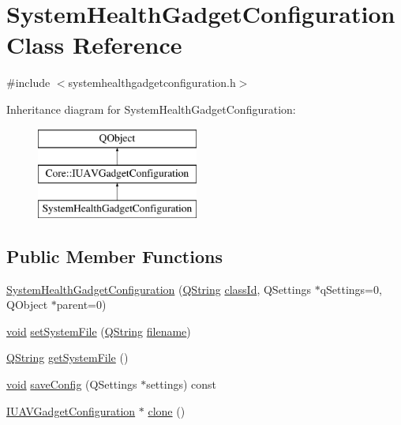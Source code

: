 \hypertarget{class_system_health_gadget_configuration}{\section{System\-Health\-Gadget\-Configuration Class Reference}
\label{class_system_health_gadget_configuration}
}


{\ttfamily \#include $<$systemhealthgadgetconfiguration.\-h$>$}

Inheritance diagram for System\-Health\-Gadget\-Configuration\-:\begin{figure}[H]
\begin{center}
\leavevmode
\includegraphics[height=3.000000cm]{class_system_health_gadget_configuration}
\end{center}
\end{figure}
\subsection*{Public Member Functions}
\begin{DoxyCompactItemize}
\item 
\hyperlink{group___system_health_plugin_gae6898d57714b4d34fc5ddc5e47e3af2e}{System\-Health\-Gadget\-Configuration} (\hyperlink{group___u_a_v_objects_plugin_gab9d252f49c333c94a72f97ce3105a32d}{Q\-String} \hyperlink{group___core_plugin_gac953657221ba7fda967ada0408332641}{class\-Id}, Q\-Settings $\ast$q\-Settings=0, Q\-Object $\ast$parent=0)
\item 
\hyperlink{group___u_a_v_objects_plugin_ga444cf2ff3f0ecbe028adce838d373f5c}{void} \hyperlink{group___system_health_plugin_gae877ad975152eb4b4df1076138610d0e}{set\-System\-File} (\hyperlink{group___u_a_v_objects_plugin_gab9d252f49c333c94a72f97ce3105a32d}{Q\-String} \hyperlink{ioapi_8h_a7a03a664b090ce5c848ecb31cb4a2fa8}{filename})
\item 
\hyperlink{group___u_a_v_objects_plugin_gab9d252f49c333c94a72f97ce3105a32d}{Q\-String} \hyperlink{group___system_health_plugin_ga4807e799ef6d19b807497d0c74295b32}{get\-System\-File} ()
\item 
\hyperlink{group___u_a_v_objects_plugin_ga444cf2ff3f0ecbe028adce838d373f5c}{void} \hyperlink{group___system_health_plugin_gabbb3ed58da74764c327a4933fbc81a53}{save\-Config} (Q\-Settings $\ast$settings) const 
\item 
\hyperlink{group___core_plugin_gacdfdf0b1e39b5002472b76b6564ce51f}{I\-U\-A\-V\-Gadget\-Configuration} $\ast$ \hyperlink{group___system_health_plugin_gaec4d54c2f539b5bbead55affc7dd496c}{clone} ()
\end{DoxyCompactItemize}



